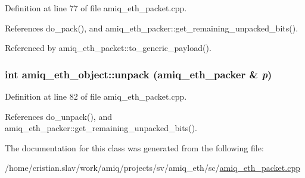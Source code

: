 Definition at line 77 of file amiq\_\-eth\_\-packet.cpp.

References do\_\-pack(), and amiq\_\-eth\_\-packer::get\_\-remaining\_\-unpacked\_\-bits().

Referenced by amiq\_\-eth\_\-packet::to\_\-generic\_\-payload().\hypertarget{classamiq__eth__object_a99591a67f736c581d67207129a344b46}{
\subsubsection[{unpack}]{\setlength{\rightskip}{0pt plus 5cm}int amiq\_\-eth\_\-object::unpack ({\bf amiq\_\-eth\_\-packer} \& {\em p})}}
\label{classamiq__eth__object_a99591a67f736c581d67207129a344b46}


Definition at line 82 of file amiq\_\-eth\_\-packet.cpp.

References do\_\-unpack(), and amiq\_\-eth\_\-packer::get\_\-remaining\_\-unpacked\_\-bits().

The documentation for this class was generated from the following file:\begin{DoxyCompactItemize}
\item 
/home/cristian.slav/work/amiq/projects/sv/amiq\_\-eth/sc/\hyperlink{amiq__eth__packet_8cpp}{amiq\_\-eth\_\-packet.cpp}\end{DoxyCompactItemize}
